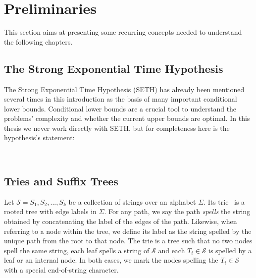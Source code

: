 \section{Preliminaries}\label{sec:prelim}

This section aims at presenting some recurring concepts needed to understand the following chapters.

\subsection{The Strong Exponential Time Hypothesis}\label{sec:prelim:seth}

The Strong Exponential Time Hypothesis (SETH) has already been mentioned several times in this introduction as the basis of many important conditional lower bounds. Conditional lower bounds are a crucial tool to understand the problems' complexity and whether the current upper bounds are optimal. In this thesis we never work directly with SETH, but for completeness here is the hypothesis's statement:

\\

\subsection{Tries and Suffix Trees}\label{sec:prelim:tries}
Let $\mathcal{S} = {S_1,S_2, ..., S_k}$ be a collection of strings over an alphabet $\Sigma$. Its trie~\cite{thue1912gegenseitige,de1959file,fredkin1960trie} is a rooted tree with edge labels in $\Sigma$.
For any path, we say the path \emph{spells} the string obtained by concatenating the label of the edges of the path.
Likewise, when referring to a node within the tree, we define its label as the string spelled by the unique path from the root to that node.
The trie is a tree such that no two nodes spell the same string, each leaf spells a string of $\mathcal{S}$ and each $T_i \in \mathcal{S}$ is spelled by a leaf or an internal node. In both cases, we mark the nodes spelling the $T_i \in \mathcal{S}$  with a special end-of-string character.

